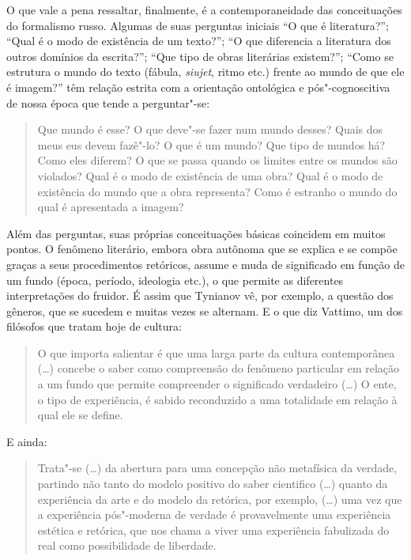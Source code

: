 O que vale a pena ressaltar, finalmente, é a contemporaneidade das
conceituações do formalismo russo. Algumas de suas perguntas iniciais
``O que é literatura?''; ``Qual é o modo de existência de um texto?'';
``O que diferencia a literatura dos outros domínios da escrita?''; ``Que
tipo de obras literárias existem?''; ``Como se estrutura o mundo do
texto (fábula, \emph{siujet}, ritmo etc.) frente ao mundo de que ele é
imagem?'' têm relação estrita com a orientação ontológica e
pós"-cognoscitiva de nossa época que tende a perguntar"-se:

\begin{quote}
Que mundo é esse? O que deve"-se fazer num mundo desses? Quais dos meus
eus devem fazê"-lo? O que é um mundo? Que tipo de mundos há? Como eles
diferem? O que se passa quando os limites entre os mundos são violados?
Qual é o modo de existência de uma obra? Qual é o modo de existência do
mundo que a obra representa? Como é estranho o mundo do qual é
apresentada a imagem? 
\end{quote}

Além das perguntas, suas próprias conceituações básicas coincidem em
muitos pontos. O fenômeno literário, embora obra autônoma que se explica
e se compõe graças a seus procedimentos retóricos, assume e muda de
significado em função de um fundo (época, período, ideologia etc.), o
que permite as diferentes interpretações do fruidor. É assim que
Tynianov vê, por exemplo, a questão dos gêneros, que se sucedem e muitas
vezes se alternam. E o que diz Vattimo, um dos filósofos que tratam hoje
de cultura:

\begin{quote}
O que importa salientar é que uma larga parte da cultura contemporânea
(\ldots{}) concebe o saber como compreensão do fenômeno particular em
relação a um fundo que permite compreender o significado verdadeiro
(\ldots{}) O ente, o tipo de experiência, é sabido reconduzido a uma
totalidade em relação à qual ele se define. 
\end{quote}

E ainda:

\begin{quote}
Trata"-se (\ldots{}) da abertura para uma concepção não metafísica da
verdade, partindo não tanto do modelo positivo do saber cientifico
(\ldots{}) quanto da experiência da arte e do modelo da retórica, por
exemplo, (\ldots{}) uma vez que a experiência pós"-moderna de verdade é
provavelmente uma experiência estética e retórica, que nos chama a viver
uma experiência fabulizada do real como possibilidade de liberdade.
\end{quote}

